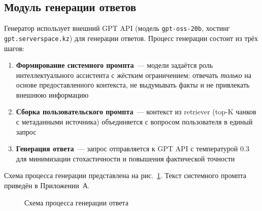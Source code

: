 \documentclass[a4paper,12pt]{article}
\begin{document}
\subsection{Модуль генерации ответов}

Генератор использует внешний GPT API (модель \texttt{gpt-oss-20b}, хостинг \texttt{gpt.serverspace.kz}) для генерации ответов. Процесс генерации состоит из трёх шагов:

\begin{enumerate}
    \item \textbf{Формирование системного промпта}~--- модели задаётся роль интеллектуального ассистента с жёстким ограничением: отвечать \emph{только} на основе предоставленного контекста, не выдумывать факты и не привлекать внешнюю информацию
    \item \textbf{Сборка пользовательского промпта}~--- контекст из retriever (top-K чанков с метаданными источника) объединяется с вопросом пользователя в единый запрос
    \item \textbf{Генерация ответа}~--- запрос отправляется к GPT API с температурой 0.3 для минимизации стохастичности и повышения фактической точности
\end{enumerate}

Схема процесса генерации представлена на рис.~\ref{fig:generation-flow}. Текст системного промпта приведён в Приложении~А.

\begin{figure}[H]
\centering
{}
\caption{Схема процесса генерации ответа}
\label{fig:generation-flow}
\end{figure}
\end{document}

